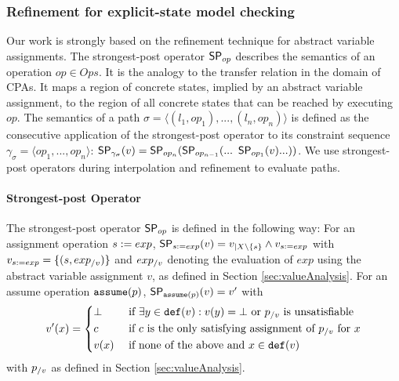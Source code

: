 \subsubsection*{Refinement for explicit-state model checking}
\label{sec:assignmentRefinement}
Our work is strongly based on the refinement technique for abstract variable assignments.
The strongest-post operator $\operatorname{\operatorname{\mathsf{SP}}}_{op}$ describes the semantics of an operation $op \in Ops$.
It is the analogy to the transfer relation in the domain of CPAs.
It maps a region of concrete states, implied by an abstract variable assignment, to the region of all concrete states that can be reached by executing $op$.
The semantics of a path $\sigma = \langle (l_1, op_1), ..., (l_n, op_n) \rangle$ is defined as the consecutive application of the strongest-post operator to its constraint sequence $\gamma_\sigma = \langle op_1, ..., op_n \rangle$:
$\strongestPostOp_{\gamma_\sigma}(v) = \strongestPostOp_{op_n}(\strongestPostOp_{op_{n-1}} (...\ \strongestPostOp_{op_1}(v) ... ))$.
We use strongest-post operators during interpolation and refinement to evaluate paths.

\paragraph*{Strongest-post Operator}
The strongest-post operator $\operatorname{\operatorname{\operatorname{\mathsf{SP}}}}_{op}$ is defined in the following way:
For an assignment operation $s := exp$, $\operatorname{\operatorname{\operatorname{\mathsf{SP}}}}_{s := exp}(v) = v_{|X \setminus \{ s \}} \wedge v_{s := exp}$ with $v_{s := exp} = \{ (s, exp_{/v}) \}$ and $exp_{/v}$ denoting the evaluation of $exp$ using the abstract variable assignment $v$, as defined in Section \ref{sec:valueAnalysis}.
For an assume operation $\texttt{assume}(p)$, 
	$\operatorname{\operatorname{\operatorname{\mathsf{SP}}}}_{\texttt{assume}(p)}(v) = v'$ with 
	\[ v'(x) = \begin{dcases}
		\bot & \text{ if } \exists y \in \texttt{def}(v) : v(y) = \bot \text{ or } p_{/v} \text{ is unsatisfiable}\\
		c & \text{ if $c$ is the only satisfying assignment of $p_{/v}$ for $x$}\\
		v(x) & \text{ if none of the above and } x \in \texttt{def}(v)
	\end{dcases}\]
	with $p_{/v}$ as defined in Section \ref{sec:valueAnalysis}.

